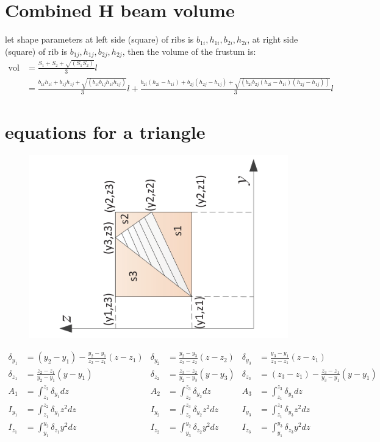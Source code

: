 \section{Combined H beam volume}
let shape parameters at left side (square) of ribs is $ b_{1i}, h_{1i}, b_{2i}, h_{2i} $, at right side (square) of rib is $ b_{1j}, h_{1j}, b_{2j}, h_{2j} $, then the volume of the frustum is:
\begin{equation}\label{eq: frustum volume}
\begin{split}
\mathrm{vol} &= \frac{S_1 + S_2 + \sqrt{(S_1 S_2)}}{3} l \\
&= \frac{b_{1i} h_{1i} + b_{1j} h_{1j} + \sqrt{(b_{1i} b_{1j} h_{1i} h_{1j} )}}{3} l + \frac{b_{2i} (h_{2i} - h_{1i}) + b_{2j} (h_{2j} - h_{1j}) + \sqrt{(b_{2i} b_{2j} (h_{2i} - h_{1i}) (h_{2j} - h_{1j}) )}}{3} l 
\end{split}
\end{equation}

\section{equations for a triangle}
\begin{figure}[h!]
\centering
\includegraphics[width=0.7\linewidth, angle=-90]{Figures/areaMomentsForTriangle}
\caption{}
\label{fig:areamomentsfortriangle}
\end{figure}

\begin{align*}
\delta_{y_1} &= (y_2-y_1)- \frac{y_2-y_1}{z_2-z_1} (z-z_1) & \delta_{y_2} &= \frac{y_2-y_3}{z_3-z_2} (z-z_2) & \delta_{y_3} &= \frac{y_3-y_1}{z_3-z_1} (z-z_1) \\
\delta_{z_1} &= \frac{z_2-z_1}{y_2-y_1} (y-y_1 ) & \delta_{z_2 } &= \frac{z_3-z_2}{y_2-y_3} (y-y_3) & \delta_{z_3} &= (z_3-z_1)- \frac{z_3-z_1}{y_3-y_1} (y-y_1) \\
A_1 &= \int_{z_1}^{z_2} \delta_{y_1} dz & A_2 &= \int_{z_2}^{z_3} \delta_{y_2} dz & A_3 &= \int_{z_1}^{z_3} \delta_{y_3} dz \\
I_{y_1} &=\int_{z_1}^{z_2} \delta_{y_1} z^2 dz & I_{y_2 } &= \int_{z_2}^{z_3} \delta_{y_2} z^2 dz & I_{y_3} &= \int_{z_1}^{z_3} \delta_{y_3} z^2 dz \\
I_{z_1} &= \int_{y_1}^{y_2} \delta_{z_1} y^2 dz & I_{z_2 } &= \int_{y_3}^{y_2} \delta_{z_2} y^2 dz & I_{z_3} &= \int_{y_1}^{y_3} \delta_{z_3} y^2 dz
\end{align*}

